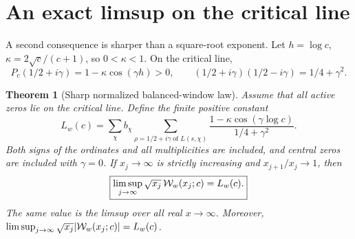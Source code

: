 \documentclass[11pt]{article}
\newtheorem{theorem}{Theorem}[section]
\theoremstyle{remark}\newtheorem{remark}[theorem]{Remark}
\begin{document}
\section{An exact limsup on the critical line}
A second consequence is sharper than a square-root exponent. Let $h=\log c$, $\kappa=2\sqrt c/(c+1)$, so $0<\kappa<1$. On the critical line,
\[
 P_c(1/2+i\gamma)=1-\kappa\cos(\gamma h)>0,
 \qquad (1/2+i\gamma)(1/2-i\gamma)=1/4+\gamma^2.
\]
\begin{theorem}[Sharp normalized balanced-window law]\label{th:limsup}
Assume that all active zeros lie on the critical line. Define the finite positive constant
\begin{equation}\label{eq:L}
 L_w(c)=\sum_{\chi}b_\chi\sum_{\rho=1/2+i\gamma\;\text{of }L(s,\chi)}
 \frac{1-\kappa\cos(\gamma\log c)}{1/4+\gamma^2}.
\end{equation}
Both signs of the ordinates and all multiplicities are included, and central zeros are included with $\gamma=0$. If $x_j\to\infty$ is strictly increasing and $x_{j+1}/x_j\to1$, then
\begin{equation}\label{eq:limsup}
 \boxed{\displaystyle\limsup_{j\to\infty}\sqrt{x_j}\,\mathcal W_w(x_j;c)=L_w(c).}
\end{equation}
The same value is the limsup over all real $x\to\infty$. Moreover,
$\limsup_{j\to\infty}\sqrt{x_j}|\mathcal W_w(x_j;c)|=L_w(c)$.
\end{theorem}
\end{document}
